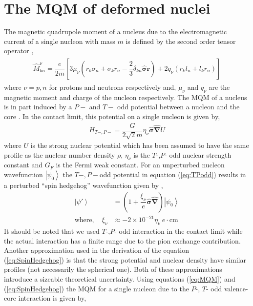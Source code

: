 \documentclass[10pt,a4paper, twoside, openright]{report}
\begin{document}
\section{The MQM of deformed nuclei}
The magnetic quadrupole moment of a nucleus due to the electromagnetic current of a single nucleon with mass $m$ is defined by the second order tensor operator \cite{SFK1984},
\begin{align} \label{eq:MQM}
\begin{split}
\hat{M}_{kn}^{\nu} = \dfrac{e}{2m}\left[3\mu_{\nu}\left(r_k\sigma_n + \sigma_kr_n - \dfrac{2}{3}\delta_{kn}\hat{\boldsymbol{\sigma}}\textbf{r}\right) + 2q_{\nu}\left(r_kl_n + l_kr_n\right)\right]
\end{split}
\end{align}
where $\nu = p,n$ for protons and neutrons respectively and, $\mu_{\nu}$ and $q_{\nu}$ are the magnetic moment and charge of the nucleon respectively. The MQM of a nucleus is in part induced by a $P-$ and $T-$ odd potential between a nucleon and the core \cite{Flambaum1994, SFK1984, KhriplovichPNC}. In the contact limit, this potential on a single nucleon is given by, 
\begin{align} \label{eq:TPodd}
H_{T-,P-} = \dfrac{G}{2\sqrt{2}m}\eta_{\nu}\hat{\boldsymbol{\sigma}}\hat{\boldsymbol{\nabla}}U
\end{align}
where $U$ is the strong nuclear potential which has been assumed to have the same profile as the nuclear number density $\rho$, $\eta_{\nu}$ is the $T$-,$P$- odd nuclear strength constant and $G_{F}$ is the Fermi weak constant. For an unperturbed nucleon wavefunction $\left|\psi_0\right>$ the  $T-,P-$odd potential in equation (\ref{eq:TPodd}) results in a perturbed ``spin hedgehog'' wavefunction given by \cite{SFK1984, Flambaum1994},
\begin{align} \label{eq:SpinHedgehog}
\left|\psi'\right> &= \left(1 + \dfrac{\xi_{\nu}}{e}\hat{\boldsymbol{\sigma}}\hat{\boldsymbol{\nabla}}\right)\left|\psi_0\right> \\
\text{where}, \quad \xi_{\nu} &\approx -2\times 10^{-21}\eta_{\nu} \ e\cdot\text{cm} \nonumber
\end{align}
It should be noted that we used   $T$-,$P$- odd interaction in the contact limit while the actual interaction has a finite range due to the pion exchange contribution. Another approximation used in the derivation of the equation (\ref{eq:SpinHedgehog}) is that the strong potential and nuclear density have similar profiles (not necessarily the  spherical one). Both of these approximations introduce a sizeable theoretical uncertainty.  Using equations (\ref{eq:MQM}) and (\ref{eq:SpinHedgehog}) the MQM for a single nucleon due to the $P$-, $T$- odd valence-core interaction is given by,
\end{document}
